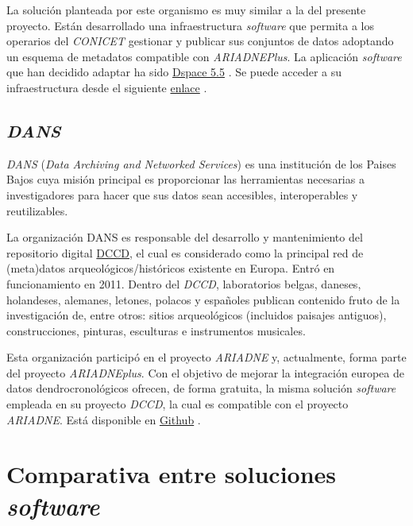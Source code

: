 La solución planteada por este organismo es muy similar a la del
presente proyecto. Están desarrollado una infraestructura
\emph{software} que permita a los operarios del \emph{CONICET} gestionar y
publicar sus conjuntos de datos adoptando un esquema de metadatos
compatible con \emph{ARIADNEPlus}. La aplicación \emph{software} que han
decidido adaptar ha sido \href{https://duraspace.org/dspace/}{Dspace
5.5} . Se puede acceder a su infraestructura desde el siguiente
\href{https://suquia.ffyh.unc.edu.ar/}{enlace} .

\subsection{\emph{DANS}}

\emph{DANS} \cite{weboff:dans} (\emph{Data Archiving and Networked Services}) 
es una institución de los Paises Bajos cuya misión principal es
proporcionar las herramientas necesarias a investigadores para hacer que
sus datos sean accesibles, interoperables y reutilizables.

La organización DANS es responsable del desarrollo y mantenimiento del
repositorio digital \href{https://dendro.dans.knaw.nl/}{DCCD}, el cual
es considerado como la principal red de (meta)datos
arqueológicos/históricos existente en Europa. Entró en funcionamiento en
2011. Dentro del \emph{DCCD}, laboratorios belgas, daneses, holandeses,
alemanes, letones, polacos y españoles publican contenido fruto de la
investigación de, entre otros: sitios arqueológicos (incluidos paisajes
antiguos), construcciones, pinturas, esculturas e instrumentos
musicales.

Esta organización participó en el proyecto \emph{ARIADNE} y,
actualmente, forma parte del proyecto \emph{ARIADNEplus}. Con el
objetivo de mejorar la integración europea de datos dendrocronológicos
ofrecen, de forma gratuita, la misma solución \emph{software} empleada
en su proyecto \emph{DCCD}, la cual es compatible con el proyecto
\emph{ARIADNE}. Está disponible en
\href{https://github.com/DANS-KNAW/dccd-webui}{Github} .


\section{Comparativa entre soluciones \emph{software}}

